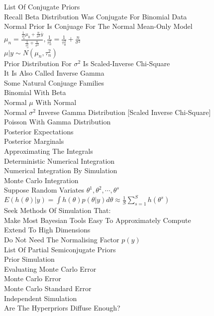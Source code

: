 List Of Conjugate Priors \\
Recall Beta Distribution Was Conjugate For Binomial Data \\
Normal Prior Is Conjuage For The Normal Mean-Only Model \\
$\mu_n=\frac{\frac{1}{\tau_0^2}\mu_0+\frac{n}{\sigma^2}\bar{y}}{\frac{1}{\tau_0^2}+\frac{n}{\sigma^2}}, \frac{1}{\tau_n^2}=\frac{1}{\tau_0^2}+\frac{n}{\sigma^2}$ \\
$\mu|y \sim N(\mu_n,\tau_n^2)$ \\
Prior Distribution For $\sigma^2$ Is Scaled-Inverse Chi-Square \\
It Is Also Called Inverse Gamma \\
Some Natural Conjuage Families \\
Binomial With Beta \\
Normal $\mu$ With Normal \\
Normal $\sigma^2$ Inverse Gamma Distribution [Scaled Inverse Chi-Square] \\
Poisson With Gamma Distribution \\
Posterior Expectations \\
Posterior Marginals \\
Approximating The Integrals \\
Deterministic Numerical Integration \\
Numerical Integration By Simulation \\
Monte Carlo Integration \\
Suppose Random Variates $\theta^1, \theta^2, \cdots, \theta^s$ \\
$E(h(\theta)|y)=\int h(\theta)p(\theta|y)d\theta \approx \frac{1}{S}\sum_{s=1}^S h(\theta^s)$ \\
Seek Methods Of Simulation That: \\
Make Most Bayesian Tools Easy To Approximately Compute \\
Extend To High Dimensions \\
Do Not Need The Normalising Factor $p(y)$ \\
List Of Partial Semiconjugate Priors \\
Prior Simulation \\
Evaluating Monte Carlo Error \\
Monte Carlo Error \\
Monte Carlo Standard Error \\
Independent Simulation \\
Are The Hyperpriors Diffuse Enough? \\
